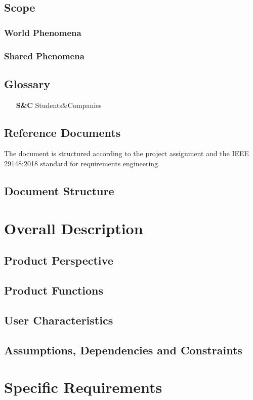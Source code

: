 \documentclass[a4paper, oneside]{book}
\begin{document}
\section{Scope}
\subsection{World Phenomena}
\subsection{Shared Phenomena}
\section{Glossary}
\begin{itemize}
    \item[\textbf{S\&C}] Students\&Companies
\end{itemize}

\section{Reference Documents}
The document is structured according to the project assignment and the IEEE 29148:2018 \cite{ieee2018} standard for requirements engineering.

\section{Document Structure}

\chapter{Overall Description}
\section{Product Perspective}
\section{Product Functions}
\section{User Characteristics}
\section{Assumptions, Dependencies and Constraints}

\chapter{Specific Requirements}
\end{document}
